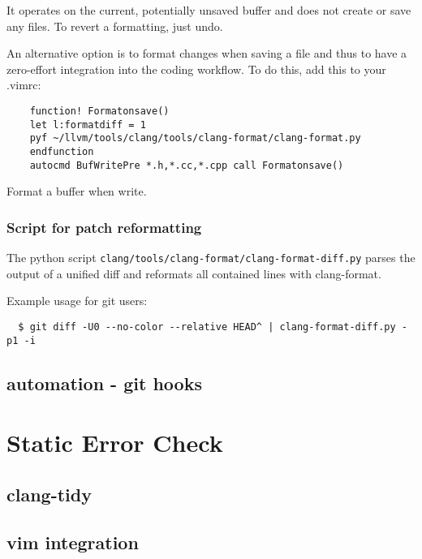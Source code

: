 It operates on the current, potentially unsaved buffer and does not create or save any files. To revert a formatting, just undo.

An alternative option is to format changes when saving a file and thus to have a zero-effort integration into the coding workflow. To do this, add this to your .vimrc:


\begin{listing}[!ht]
  \begin{verbatim}
    function! Formatonsave()
    let l:formatdiff = 1
    pyf ~/llvm/tools/clang/tools/clang-format/clang-format.py
    endfunction
    autocmd BufWritePre *.h,*.cc,*.cpp call Formatonsave()
  \end{verbatim}
  \caption{Format a buffer when write.}
  \label{vim.clang.format.all.buffer}
\end{listing}


\subsubsection{Script for patch reformatting}%
\label{ssub:script_for_patch_reformatting}


The python script \texttt{clang/tools/clang-format/clang-format-diff.py} parses the output of a unified diff and reformats all contained lines with clang-format.

Example usage for git users:


\begin{verbatim}
  $ git diff -U0 --no-color --relative HEAD^ | clang-format-diff.py -p1 -i
\end{verbatim}

\subsection{automation - git hooks}



\section{Static Error Check}
\subsection{clang-tidy}
\subsection{vim integration}


